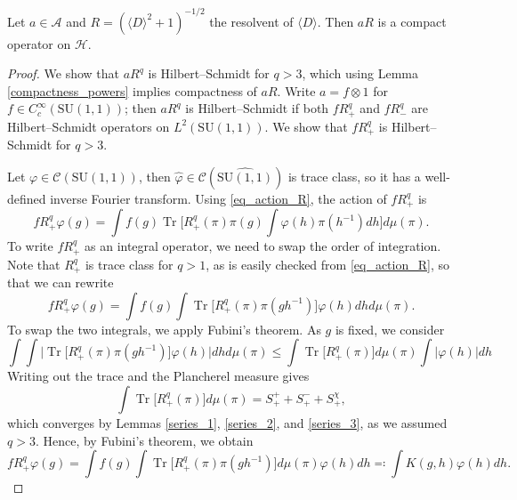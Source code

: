 \documentclass[10pt,a4paper]{amsart}
\DeclareMathOperator{\Tr}{Tr}
\begin{document}
\begin{lemma}\label{compact_resolvent}
    Let $a\in\mathcal{A}$ and $R=(\langle D\rangle^2+1)^{-1/2}$ the resolvent of $\langle D\rangle$. Then $aR$ is a compact operator on $\mathcal{H}$.
\end{lemma}

\begin{proof}
    We show that $aR^q$ is Hilbert--Schmidt for $q>3$, which using Lemma \ref{compactness_powers} implies compactness of $aR$. Write $a=f\otimes 1$ for $f\in C_c^\infty(\mathrm{SU}(1,1))$; then $aR^q$ is Hilbert--Schmidt if both $fR_+^q$ and $fR_-^q$ are Hilbert--Schmidt operators on $L^2(\mathrm{SU}(1,1))$. We show that $fR_+^q$ is Hilbert--Schmidt for $q>3$. 

    Let $\varphi\in\mathcal{C}(\mathrm{SU}(1,1))$, then $\hat{\varphi}\in\mathcal{C}(\widehat{\mathrm{SU}(1,1)})$ is trace class, so it has a well-defined inverse Fourier transform. Using \eqref{eq_action_R}, the action of $fR_+^q$ is
    \begin{equation*}
        fR_+^q\varphi(g)=\int f(g)\Tr\bigg[R_+^q(\pi)\pi(g)\int\varphi(h)\pi(h^{-1})dh\bigg]d\mu(\pi).
    \end{equation*}
    To write $fR_+^q$ as an integral operator, we need to swap the order of integration. Note that $R_+^q$ is trace class for $q>1$, as is easily checked from \eqref{eq_action_R}, so that we can rewrite
    \begin{equation*}
        fR_+^q\varphi(g)=\int f(g) \int\Tr\big[R_+^q(\pi)\pi(gh^{-1})\big]\varphi(h)dhd\mu(\pi).
    \end{equation*}
    To swap the two integrals, we apply Fubini's theorem. As $g$ is fixed, we consider
    \begin{equation*}
        \int\int\Big|\Tr\big[R_+^q(\pi)\pi(gh^{-1})\big]\varphi(h)\Big|dhd\mu(\pi)\leq \int\Tr\big[R_+^q(\pi)\big]d\mu(\pi)\int|\varphi(h)|dh
    \end{equation*}
    Writing out the trace and the Plancherel measure gives
    \begin{equation*}
        \int\Tr\big[R_+^q(\pi)\big]d\mu(\pi)=S^+_++S^-_++S^\chi_+,
    \end{equation*}
    which converges by Lemmas \ref{series_1}, \ref{series_2}, and \ref{series_3}, as we assumed $q>3$. Hence, by Fubini's theorem, we obtain
    \begin{equation*}
        fR_+^q\varphi(g)=\int f(g)\int\Tr\big[R_+^q(\pi)\pi(gh^{-1})\big]d\mu(\pi)\varphi(h)dh\eqcolon\int K(g,h)\varphi(h)dh.
    \end{equation*}


\end{proof}
\end{document}
